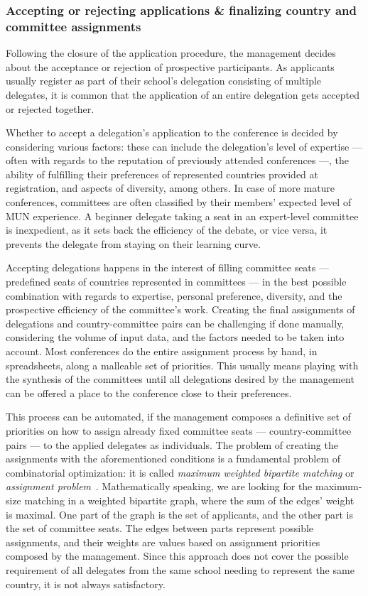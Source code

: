 \subsubsection{Accepting or rejecting applications \& finalizing country and committee assignments}

Following the closure of the application procedure, the management decides about the acceptance or rejection of prospective participants. As applicants usually register as part of their school's delegation consisting of multiple delegates, it is common that the application of an entire delegation gets accepted or rejected together.

Whether to accept a delegation's application to the conference is decided by considering various factors: these can include the delegation's level of expertise — often with regards to the reputation of previously attended conferences —, the ability of fulfilling their preferences of represented countries provided at registration, and aspects of diversity, among others. In case of more mature conferences, committees are often classified by their members' expected level of MUN experience. A beginner delegate taking a seat in an expert-level committee is inexpedient, as it sets back the efficiency of the debate, or vice versa, it prevents the delegate from staying on their learning curve.

Accepting delegations happens in the interest of filling committee seats — predefined seats of countries represented in committees — in the best possible combination with regards to expertise, personal preference, diversity, and the prospective efficiency of the committee's work. Creating the final assignments of delegations and country-committee pairs can be challenging if done manually, considering the volume of input data, and the factors needed to be taken into account. Most conferences do the entire assignment process by hand, in spreadsheets, along a malleable set of priorities. This usually means playing with the synthesis of the committees until all delegations desired by the management can be offered a place to the conference close to their preferences.

This process can be automated, if the management composes a definitive set of priorities on how to assign already fixed committee seats — country-committee pairs — to the applied delegates as individuals. The problem of creating the assignments with the aforementioned conditions is a fundamental problem of combinatorial optimization: it is called \emph{maximum weighted bipartite matching} or \emph{assignment problem}~\cite{ropi}. Mathematically speaking, we are looking for the maximum-size matching in a weighted bipartite graph, where the sum of the edges' weight is maximal. One part of the graph is the set of applicants, and the other part is the set of committee seats. The edges between parts represent possible assignments, and their weights are  values based on assignment priorities composed by the management. Since this approach does not cover the possible requirement of all delegates from the same school needing to represent the same country, it is not always satisfactory.

